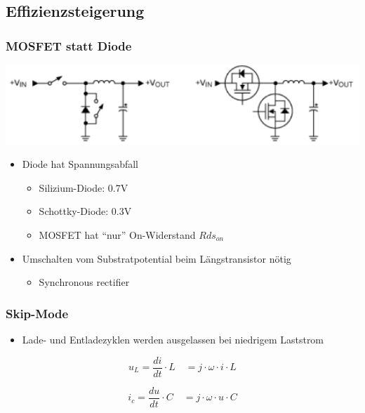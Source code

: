 \subsection{Effizienzsteigerung}
\begin{minipage}{0.69\textwidth}
\subsubsection{MOSFET statt Diode}
\includegraphics[scale=0.5]{pictures/effizient1}
\begin{itemize}
  \item Diode hat Spannungsabfall
  \begin{itemize}
    \item Silizium-Diode: 0.7V
    \item Schottky-Diode: 0.3V
    \item MOSFET hat "`nur"' On-Widerstand $Rds_{on}$
    \end{itemize}
   \item Umschalten vom Substratpotential beim Längstransistor nötig
   \begin{itemize}
     \item Synchronous rectifier
    \end{itemize}
\end{itemize}
\end{minipage}
\begin{minipage}{0.29\textwidth}
\subsubsection{Skip-Mode}
\begin{itemize}
  \item Lade- und Entladezyklen werden ausgelassen bei niedrigem Laststrom
\end{itemize}
\end{minipage}

\vspace{1cm}
\begin{Large}

\begin{minipage}{0.49\textwidth}

\[\boxed{
	u_L=\frac{di}{dt}\cdot L \quad = j\cdot\omega \cdot i\cdot L
}\]
\end{minipage}
\begin{minipage}{0.49\textwidth}
\[\boxed{
	i_c=\frac{du}{dt}\cdot C\quad = j\cdot\omega \cdot u\cdot C
}\]
\end{minipage}

\end{Large}
